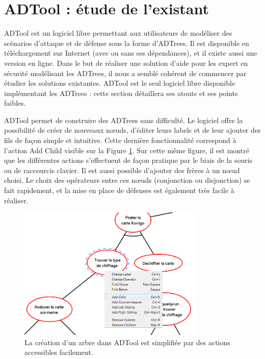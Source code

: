 \section{ADTool : étude de l'existant}
	\label{sec:adtool}

	ADTool est un logiciel libre permettant aux utilisateurs de modéliser des scénarios d'attaque et de défense sous la forme d'ADTrees. Il est disponible en téléchargement sur Internet (avec ou sans ses dépendances), et il existe aussi une version en ligne. Dans le but de réaliser une solution d'aide pour les expert en sécurité modélisant les ADTrees, il nous a semblé cohérent de commencer par étudier les solutions existantes. ADTool est le seul logiciel libre disponible implémentant les ADTrees : cette section détaillera ses atouts et ses points faibles.

	ADTool permet de construire des ADTrees sans difficulté. Le logiciel offre la possibilité de créer de nouveaux nœuds, d'éditer leurs labels et de leur ajouter des fils de façon simple et intuitive. Cette dernière fonctionnalité correspond à l'action \og Add Child \fg{} visible sur la {\sc Figure} \ref{fig:arbre_exemple_1}. Sur cette même figure, il est montré que les différentes actions s'effectuent de façon pratique par le biais de la souris ou de raccourcis clavier. Il est aussi possible d'ajouter des frères à un nœud choisi. Le choix des opérateurs entre ces nœuds (conjonction ou disjonction)  se fait rapidement, et la mise en place de défenses est également très facile à réaliser. 
	
	\begin{figure}[h]
        \centering
        \includegraphics[width=0.8\textwidth]{figure/adtool_add_child.png}
        \caption{La création d'un arbre dans ADTool est simplifiée par des actions accessibles facilement.}
        \label{fig:arbre_exemple_1}
    \end{figure}
	

